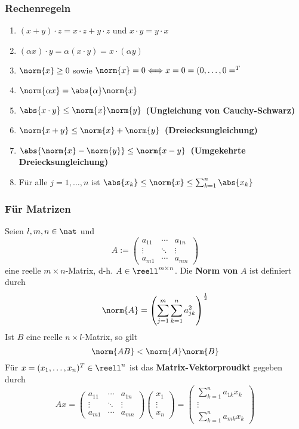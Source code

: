 \documentclass{kit}
\begin{document}
    \subsubsection{Rechenregeln}
      \begin{enumerate}
        \item $(x+y)\cdot z=x\cdot z+y\cdot z$ und $x\cdot y=y\cdot x$
        \item $(\alpha x)\cdot y=\alpha(x\cdot y)=x\cdot(\alpha y)$
        \item $\norm{x}\ge0$ sowie $\norm{x}=0\Longleftrightarrow x=0=(0,\dots,0=^T$
        \item $\norm{\alpha x}=\abs{\alpha}\norm{x}$
        \item $\abs{x\cdot y}\le\norm{x}\norm{y}$\ \textbf{(Ungleichung von Cauchy-Schwarz)}
        \item $\norm{x+y}\le\norm{x}+\norm{y}$\ \textbf{(Dreiecksungleichung)}
        \item $\abs{\norm{x}-\norm{y}}\le\norm{x-y}$\ \textbf{(Umgekehrte Dreiecksungleichung)}
        \item Für alle $j=1,\dots,n$ ist $\abs{x_k}\le\norm{x}\le\sum^n_{k=1}\abs{x_k}$
      \end{enumerate}
    \subsubsection{Für Matrizen}
      Seien $l,m,n\in\nat$ und
      $$A:=\begin{pmatrix}
        a_{11} & \cdots & a_{1n}\\
        \vdots & \ddots & \vdots\\
        a_{m1} & \cdots & a_{mn}
      \end{pmatrix}$$
      eine reelle $m\times n$-Matrix, d-h. $A\in\reell^{m\times n}$. Die \textbf{Norm von} $A$ ist definiert durch
      $$\norm{A}=\left(\sum^m_{j=1}\sum^n_{k=1}a_{jk}^2\right)^\frac{1}{2}$$
      Ist $B$ eine reelle $n\times l$-Matrix, so gilt 
      $$\norm{AB}<\norm{A}\norm{B}$$
      Für $x=(x_1,\dots,x_n)^T\in\reell^n$ ist das \textbf{Matrix-Vektorproudkt} gegeben durch
      $$Ax=\begin{pmatrix}
        a_{11} & \cdots & a_{1n}\\
        \vdots & \ddots & \vdots\\
        a_{m1} & \cdots & a_{mn}
      \end{pmatrix}\begin{pmatrix}
        x_1\\ \vdots\\ x_n
      \end{pmatrix}=\begin{pmatrix}
      \sum^n_{k=1}a_{1k}x_k\\
      \vdots\\
      \sum^n_{k=1}a_{mk}x_k
      \end{pmatrix}$$
\end{document}
